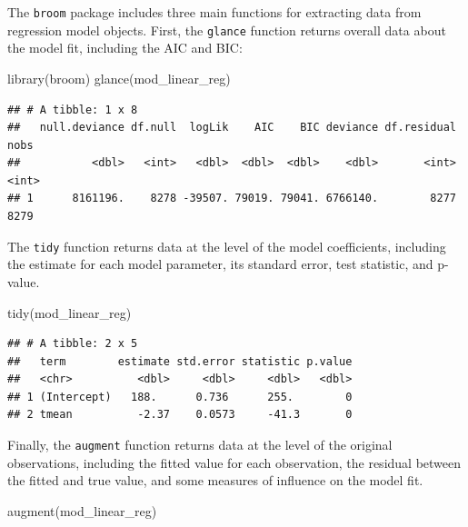 \documentclass[
]{book}
\newenvironment{Shaded}{\begin{snugshade}}{\end{snugshade}}
\newcommand{\FunctionTok}[1]{\textcolor[rgb]{0.00,0.00,0.00}{#1}}
\newcommand{\NormalTok}[1]{#1}
\begin{document}
The \texttt{broom} package includes three main functions for extracting data from
regression model objects. First, the \texttt{glance} function returns overall data
about the model fit, including the AIC and BIC:

\begin{Shaded}
\begin{Highlighting}[]
\FunctionTok{library}\NormalTok{(broom)}
\FunctionTok{glance}\NormalTok{(mod\_linear\_reg)}
\end{Highlighting}
\end{Shaded}

\begin{verbatim}
## # A tibble: 1 x 8
##   null.deviance df.null  logLik    AIC    BIC deviance df.residual  nobs
##           <dbl>   <int>   <dbl>  <dbl>  <dbl>    <dbl>       <int> <int>
## 1      8161196.    8278 -39507. 79019. 79041. 6766140.        8277  8279
\end{verbatim}

The \texttt{tidy} function returns data at the level of the model coefficients,
including the estimate for each model parameter, its standard error, test
statistic, and p-value.

\begin{Shaded}
\begin{Highlighting}[]
\FunctionTok{tidy}\NormalTok{(mod\_linear\_reg)}
\end{Highlighting}
\end{Shaded}

\begin{verbatim}
## # A tibble: 2 x 5
##   term        estimate std.error statistic p.value
##   <chr>          <dbl>     <dbl>     <dbl>   <dbl>
## 1 (Intercept)   188.      0.736      255.        0
## 2 tmean          -2.37    0.0573     -41.3       0
\end{verbatim}

Finally, the \texttt{augment} function returns data at the level of the original
observations, including the fitted value for each observation, the residual
between the fitted and true value, and some measures of influence on the model
fit.

\begin{Shaded}
\begin{Highlighting}[]
\FunctionTok{augment}\NormalTok{(mod\_linear\_reg)}
\end{Highlighting}
\end{Shaded}
\end{document}
